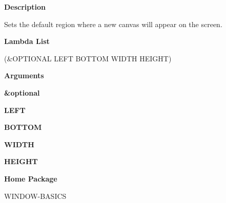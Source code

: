  
{\bf Description}

Sets the default region where a new canvas will appear on the screen.

 
{\bf Lambda List}

(\&OPTIONAL LEFT BOTTOM WIDTH HEIGHT)

 
{\bf Arguments}


\beginhang
{\bf \&optional}\hspace{2em}
 
{\bf LEFT}


 
{\bf BOTTOM}


 
{\bf WIDTH}


 
{\bf HEIGHT}


 
\endhang
 
{\bf Home Package}

WINDOW-BASICS

